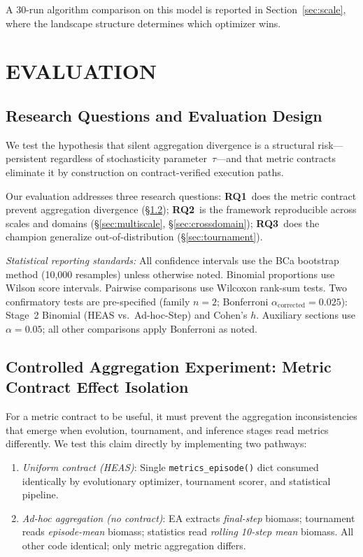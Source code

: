 \documentclass{wscpaperproc}
\begin{document}
A 30-run algorithm comparison on this model is reported in Section~\ref{sec:scale},
where the landscape structure determines which optimizer wins.

\section{EVALUATION}

\subsection{Research Questions and Evaluation Design}

We test the hypothesis that silent aggregation divergence is a structural
risk---persistent regardless of stochasticity parameter~$\tau$---and that metric
contracts eliminate it by construction on contract-verified execution paths.

Our evaluation addresses three research questions:
\textbf{RQ1}~does the metric contract prevent aggregation divergence
(\S\ref{sec:controlled-agg});
\textbf{RQ2}~is the framework reproducible across scales and domains
(\S\ref{sec:multiscale}, \S\ref{sec:crossdomain});
\textbf{RQ3}~does the champion generalize out-of-distribution
(\S\ref{sec:tournament}).

\emph{Statistical reporting standards:} All confidence intervals use the BCa
bootstrap method (10,000 resamples) unless otherwise noted. Binomial proportions
use Wilson score intervals. Pairwise comparisons use Wilcoxon rank-sum tests.
Two confirmatory tests are pre-specified (family $n\!=\!2$; Bonferroni
$\alpha_{\text{corrected}}\!=\!0.025$): Stage~2 Binomial (HEAS vs.\ Ad-hoc-Step) and
Cohen's $h$. Auxiliary sections use $\alpha\!=\!0.05$; all other comparisons apply
Bonferroni as noted.

\subsection{Controlled Aggregation Experiment: Metric Contract Effect Isolation}
\label{sec:controlled-agg}

For a metric contract to be useful, it must prevent the aggregation inconsistencies
that emerge when evolution, tournament, and inference stages read metrics differently.
We test this claim directly by implementing two pathways:

\begin{enumerate}
\item \emph{Uniform contract (HEAS)}: Single \texttt{metrics\_episode()} dict consumed
identically by evolutionary optimizer, tournament scorer, and statistical pipeline.
\item \emph{Ad-hoc aggregation (no contract)}: EA extracts \emph{final-step} biomass;
tournament reads \emph{episode-mean} biomass; statistics read \emph{rolling 10-step mean}
biomass. All other code identical; only metric aggregation differs.
\end{enumerate}
\end{document}
